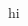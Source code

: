 \usepackage{tikz}
\usepackage{rotating}


\hbox{\vrule height1cm width1cm depth0cm}

\mbox{hi}

\hbox{\vrule height1cm width1cm depth0cm}
